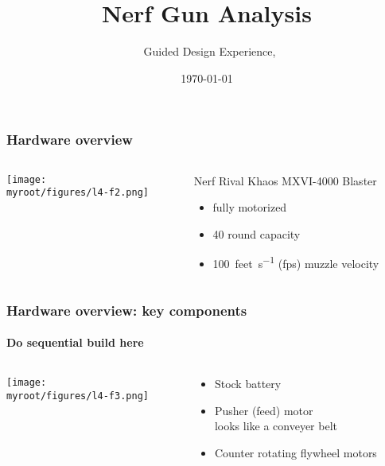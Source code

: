 \documentclass[aspectratio=169]{beamer}
\title{Nerf Gun Analysis}
\subtitle{\usnaCourseNumber\ Guided Design Experience, \usnaCourseTerm}
\author{\usnaInstructorShort}
\date{\today}
\newcommand{\myroot}{../..}
\begin{document}
\settitlebg
\begin{frame}
\titlepage
\end{frame}

\setslidebg
\begin{frame}
\frametitle{Hardware overview}
\begin{columns}
\begin{column}{0.5\textwidth}
\begin{center}
\texttt{[image: \\myroot/figures/l4-f2.png]}
\end{center}
\end{column}
\begin{column}{0.5\textwidth}
Nerf Rival Khaos MXVI-4000 Blaster
\begin{itemize}
\item fully motorized
\item 40 round capacity
\item \SI{100}{feet\per\second} (fps) muzzle velocity
\end{itemize}
\end{column}
\end{columns}
\end{frame}

\begin{frame}
\frametitle{Hardware overview: key components}
\framesubtitle{Do sequential build here}
\begin{columns}
\begin{column}{0.66\textwidth}
\begin{center}
\texttt{[image: \\myroot/figures/l4-f3.png]}
\end{center}
\end{column}
\begin{column}{0.33\textwidth}
\begin{itemize}
\item Stock battery
\item Pusher (feed) motor\\
{\scriptsize looks like a conveyer belt}
\item Counter rotating flywheel motors
\end{itemize}
\end{column}
\end{columns}
\end{frame}
\end{document}
